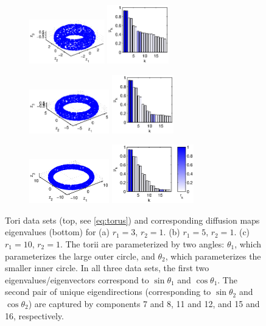 \documentclass[3p]{elsarticle}
\begin{document}
\begin{figure}[t]
\centering
\begin{subfigure}{1.5in}
\centering
\includegraphics[height=0.75in]{torus1}
\includegraphics[height=1in]{torus1_evals}
\caption{}
\end{subfigure}
%
%
\begin{subfigure}{1.5in}
\centering
\includegraphics[height=0.75in]{torus2}
\includegraphics[height=1in]{torus2_evals}
\caption{}
\end{subfigure}
%
%
\begin{subfigure}{1.5in}
\centering
\includegraphics[height=0.75in]{torus3}
\includegraphics[height=1in]{torus3_evals}
\caption{}
\end{subfigure}
%
\hfill
%
\caption{Tori data sets (top, see \eqref{eq:torus}) and corresponding diffusion maps eigenvalues (bottom) for (a) $r_1 = 3$, $r_2 = 1$. (b) $r_1 = 5$, $r_2 = 1$. (c) $r_1 = 10$, $r_2 = 1$. The torii are parameterized by two angles: $\theta_1$, which parameterizes the large outer circle, and $\theta_2$, which parameterizes the smaller inner circle. In all three data sets, the first two eigenvalues/eigenvectors correspond to $\sin \theta_1$ and $\cos \theta_1$. The second pair of unique eigendirections (corresponding to $\sin \theta_2$ and $\cos \theta_2$) are captured by components 7 and 8, 11 and 12, and 15 and 16, respectively.}
%
\label{fig:torus}
%
\end{figure}
\end{document}
